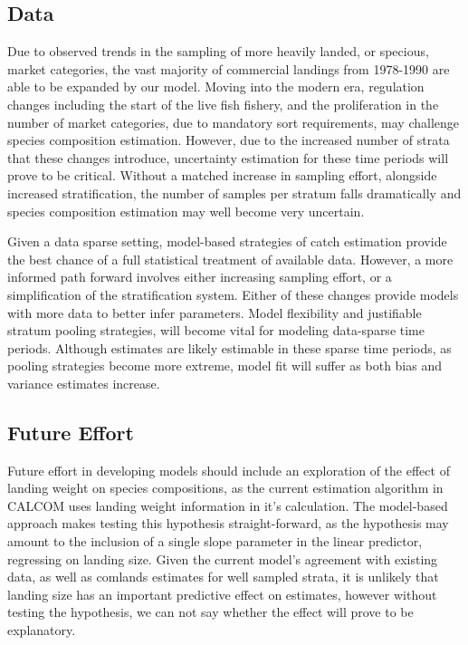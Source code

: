 \documentclass[12pt]{article}
\begin{document}
\subsection{Data}\label{data-1}

Due to observed trends in the sampling of more heavily landed, or
specious, market categories, the vast majority of commercial landings
from 1978-1990 are able to be expanded by our model. Moving into the
modern era, regulation changes including the start of the live fish
fishery, and the proliferation in the number of market categories, due
to mandatory sort requirements, may challenge species composition
estimation. However, due to the increased number of strata that these
changes introduce, uncertainty estimation for these time periods will
prove to be critical. Without a matched increase in sampling effort,
alongside increased stratification, the number of samples per stratum
falls dramatically and species composition estimation may well become
very uncertain.

Given a data sparse setting, model-based strategies of catch estimation
provide the best chance of a full statistical treatment of available
data. However, a more informed path forward involves either increasing
sampling effort, or a simplification of the stratification system.
Either of these changes provide models with more data to better infer
parameters. Model flexibility and justifiable stratum pooling
strategies, will become vital for modeling data-sparse time periods.
Although estimates are likely estimable in these sparse time periods, as
pooling strategies become more extreme, model fit will suffer as both
bias and variance estimates increase.

\subsection{Future Effort}\label{future-effort}

Future effort in developing models should include an exploration of the
effect of landing weight on species compositions, as the current estimation
algorithm in CALCOM uses landing weight information in it's calculation. The 
model-based approach makes testing this hypothesis straight-forward, as the 
hypothesis may amount to the inclusion of a single slope parameter in the 
linear predictor, regressing on landing size. Given the current model's 
agreement with existing data, as well as comlands estimates for well sampled 
strata, it is unlikely that landing size has an important predictive effect on 
estimates, however without testing the hypothesis, we can not say whether the 
effect will prove to be explanatory.
\end{document}

